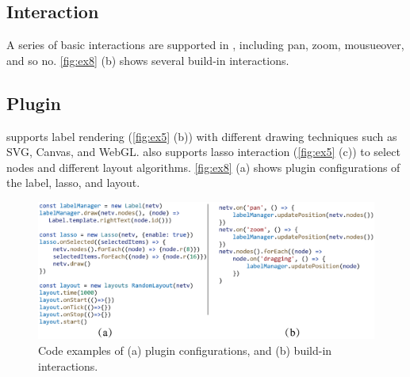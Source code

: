 

\subsection{Interaction}
A series of basic interactions are supported in \name, including pan, zoom, mousueover, and so no. \autoref{fig:ex8} (b) shows several build-in interactions.

\subsection{Plugin}

\name supports label rendering (\autoref{fig:ex5} (b)) with different drawing techniques such as SVG, Canvas, and WebGL. \name also supports lasso interaction (\autoref{fig:ex5} (c)) to select nodes and different layout algorithms. \autoref{fig:ex8} (a) shows plugin configurations of the label, lasso, and layout.


\begin{figure}
    \includegraphics[width=\linewidth]{fig/ex8.eps}
    \caption{
        Code examples of (a) plugin configurations, and (b) build-in interactions.
    }
    \label{fig:ex8}
\end{figure}

